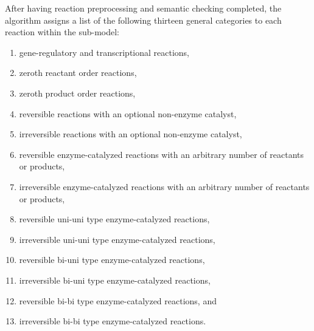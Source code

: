 After having reaction preprocessing and semantic checking completed, the algorithm assigns a list of the following thirteen general categories to each reaction within the sub-model:\\
\noindent
\begin{minipage}[t]{.5\textwidth}
\raggedleft
\begin{enumerate}
  \item gene-regulatory and transcriptional reactions,
  \item zeroth reactant order reactions,
  \item zeroth product order reactions,
  \item reversible reactions with an optional non-enzyme catalyst,
  \item irreversible reactions with an optional non-enzyme catalyst,
  \item reversible enzyme-catalyzed reactions with an arbitrary number of reactants or products,
  \item irreversible enzyme-catalyzed reactions with an arbitrary number of reactants or products,
\end{enumerate}
\end{minipage}%
\begin{minipage}[t]{.5\textwidth}
\raggedleft
\begin{enumerate}
  \setcounter{enumi}{7}
  \item reversible uni-uni type enzyme-catalyzed reactions,
  \item irreversible uni-uni type enzyme-catalyzed reactions,
  \item reversible bi-uni type enzyme-catalyzed reactions,
  \item irreversible bi-uni type enzyme-catalyzed reactions,
  \item reversible bi-bi type enzyme-catalyzed reactions, and
  \item irreversible bi-bi type enzyme-catalyzed reactions.
\end{enumerate}
\end{minipage}\\[1em]
